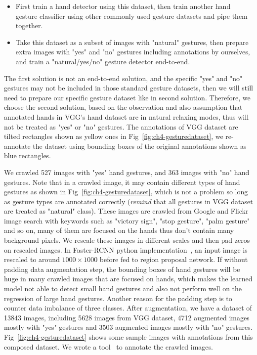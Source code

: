 \begin{itemize}
\item First train a hand detector using this dataset, then train another hand gesture classifier using other commonly used gesture datasets and pipe them together.
\item Take this dataset as a subset of images with "natural" gestures, then prepare extra images with "yes" and "no" gestures including annotations by ourselves, and train a "natural/yes/no" gesture detector end-to-end.
\end{itemize}

The first solution is not an end-to-end solution, and the specific "yes" and "no" gestures may not be included in those standard gesture datasets, then we will still need to prepare our specific gesture dataset like in second solution. Therefore, we choose the second solution, based on the observation and also assumption that annotated hands in VGG's hand dataset are in natural relaxing modes, thus will not be treated as "yes" or "no" gestures. The annotations of VGG dataset are tilted rectangles shown as yellow ones in Fig~\ref{fig:ch4-gesturedataset}, we re-annotate the dataset using bounding boxes of the original annotations shown as blue rectangles.

We crawled 527 images with "yes" hand gestures, and 363 images with "no" hand gestures. Note that in a crawled image, it may contain different types of hand gestures as shown in Fig~\ref{fig:ch4-gesturedataset}, which is not a problem so long as gesture types are annotated correctly (\emph{remind} that all gestures in VGG dataset are treated as "natural" class). These images are crawled from Google and Flickr image search with keywords such as "victory sign", "stop gesture", "palm gesture" and so on, many of them are focused on the hands thus don't contain many background pixels. We rescale these images in different scales and then pad zeros on rescaled images. In Faster-RCNN python implementation~\cite{links:pyfasterrcnn}, an input image is rescaled to around $1000\times 1000$ before fed to region proposal network. If without padding data augmentation step, the bounding boxes of hand gestures will be huge in many crawled images that are focused on hands, which makes the learned model not able to detect small hand gestures and also not perform well on the regression of large hand gestures. Another reason for the padding step is to counter data imbalance of three classes. After augmentation, we have a dataset of 13843 images, including 5628 images from VGG dataset, 4712 augmented images mostly with "yes" gestures and 3503 augmented images mostly with "no" gestures. Fig~\ref{fig:ch4-gesturedataset} shows some sample images with annotations from this composed dataset. We wrote a tool~\cite{links:imgannota} to annotate the crawled images.

